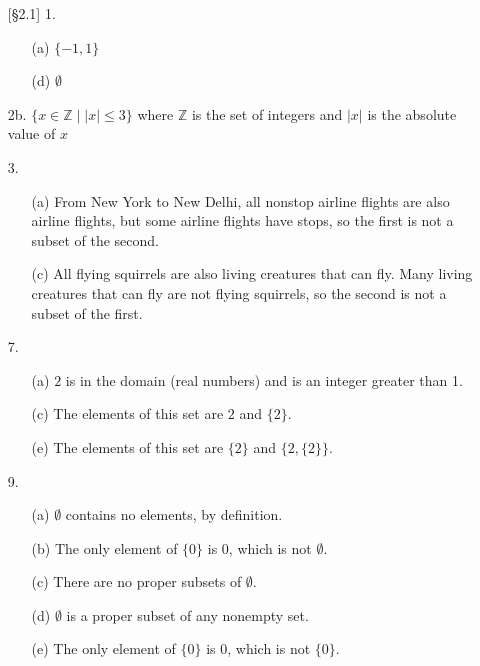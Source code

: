 \documentclass{article}
\begin{document}
\begin{enumerate}
    \item[{[\S 2.1]} 1.]
        \begin{itemize}
            \item[(a)] $\{-1,1\}$
            \item[(d)] $\emptyset$ %
        \end{itemize}
    \item[2b.] $\{ x \in \mathbb{Z} \mid \lvert x \rvert \le 3 \}$ \qquad where $\mathbb{Z}$ is the set of integers and $\lvert x \rvert$ is the absolute value of $x$
    \item[3.]
        \begin{itemize}
            \item[(a)]  From New York to New Delhi, all nonstop airline flights are also airline flights, but some airline flights have stops, so the first is not a subset of the second.
            \item[(c)]  All flying squirrels are also living creatures that can fly. Many living creatures that can fly are not flying squirrels, so the second is not a subset of the first.
        \end{itemize}
    \item[7.]
        \begin{itemize}
            \item[(a)]  $2$ is in the domain (real numbers) and is an integer greater than 1.
            \item[(c)]  The elements of this set are $2$ and $\{2\}$.
            \item[(e)]  The elements of this set are $\{2\}$ and $\{2, \{2\}\}$.
        \end{itemize}
    \item[9.]
        \begin{itemize}
            \item[(a)]  $\emptyset$ contains no elements, by definition.
            \item[(b)]  The only element of $\{0\}$ is 0, which is not $\emptyset$.
            \item[(c)]  There are no proper subsets of $\emptyset$.
            \item[(d)]  $\emptyset$ is a proper subset of any nonempty set.
            \item[(e)]  The only element of $\{0\}$ is $0$, which is not $\{0\}$.

\end{itemize}
\end{enumerate}
\end{document}
